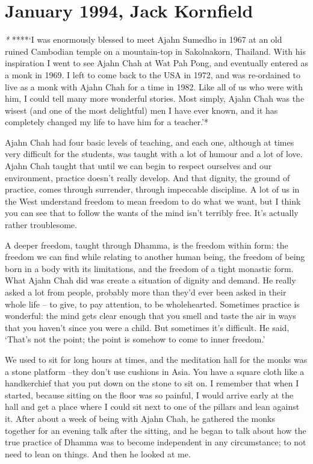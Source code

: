 \chapter{January 1994, Jack Kornfield}

\emph{*} ****`I was enormously blessed to meet Ajahn Sumedho in 1967 at
an old ruined Cambodian temple on a mountain-top in Sakolnakorn,
Thailand. With his inspiration I went to see Ajahn Chah at Wat Pah Pong,
and eventually entered as a monk in 1969. I left to come back to the USA
in 1972, and was re-ordained to live as a monk with Ajahn Chah for a
time in 1982. Like all of us who were with him, I could tell many more
wonderful stories. Most simply, Ajahn Chah was the wisest (and one of
the most delightful) men I have ever known, and it has completely
changed my life to have him for a teacher.'*

Ajahn Chah had four basic levels of teaching, and each one, although at
times very difficult for the students, was taught with a lot of humour
and a lot of love. Ajahn Chah taught that until we can begin to respect
ourselves and our environment, practice doesn't really develop. And that
dignity, the ground of practice, comes through surrender, through
impeccable discipline. A lot of us in the West understand freedom to
mean freedom to do what we want, but I think you can see that to follow
the wants of the mind isn't terribly free. It's actually rather
troublesome.

A deeper freedom, taught through Dhamma, is the freedom within form: the
freedom we can find while relating to another human being, the freedom
of being born in a body with its limitations, and the freedom of a tight
monastic form. What Ajahn Chah did was create a situation of dignity and
demand. He really asked a lot from people, probably more than they'd
ever been asked in their whole life -- to give, to pay attention, to be
wholehearted. Sometimes practice is wonderful: the mind gets clear
enough that you smell and taste the air in ways that you haven't since
you were a child. But sometimes it's difficult. He said, `That's not the
point; the point is somehow to come to inner freedom.'

We used to sit for long hours at times, and the meditation hall for the
monks was a stone platform --they don't use cushions in Asia. You have a
square cloth like a handkerchief that you put down on the stone to sit
on. I remember that when I started, because sitting on the floor was so
painful, I would arrive early at the hall and get a place where I could
sit next to one of the pillars and lean against it. After about a week
of being with Ajahn Chah, he gathered the monks together for an evening
talk after the sitting, and he began to talk about how the true practice
of Dhamma was to become independent in any circumstance; to not need to
lean on things. And then he looked at me.

